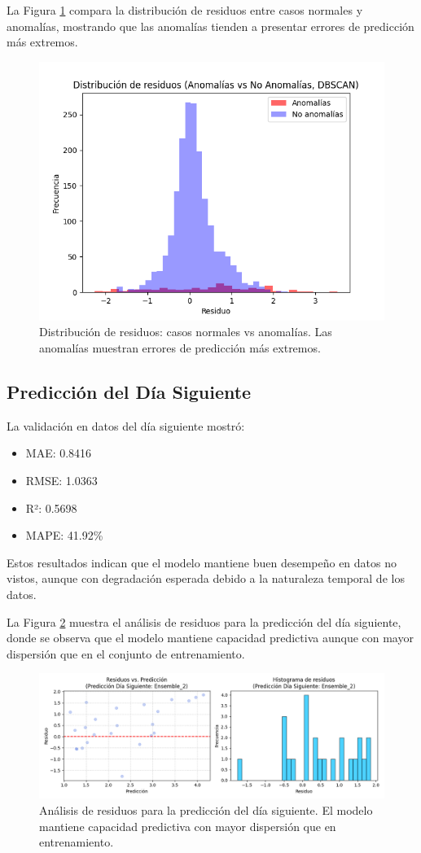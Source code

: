 \documentclass[conference]{IEEEtran}
\begin{document}
	La Figura \ref{fig:distribucion_residuos} compara la distribución de residuos entre casos normales y anomalías, mostrando que las anomalías tienden a presentar errores de predicción más extremos.
	
	\begin{figure}[htbp]
		\centering
		\includegraphics[width=0.7\linewidth]{images/Figure_5.png}
		\caption{Distribución de residuos: casos normales vs anomalías. Las anomalías muestran errores de predicción más extremos.}
		\label{fig:distribucion_residuos}
	\end{figure}
	
	\subsection{Predicción del Día Siguiente}
	La validación en datos del día siguiente mostró:
	\begin{itemize}
		\item MAE: 0.8416
		\item RMSE: 1.0363
		\item R²: 0.5698
		\item MAPE: 41.92\%
	\end{itemize}
	
	Estos resultados indican que el modelo mantiene buen desempeño en datos no vistos, aunque con degradación esperada debido a la naturaleza temporal de los datos.
	
	La Figura \ref{fig:residuos_prediccion} muestra el análisis de residuos para la predicción del día siguiente, donde se observa que el modelo mantiene capacidad predictiva aunque con mayor dispersión que en el conjunto de entrenamiento.
	
	\begin{figure}[htbp]
		\centering
		\includegraphics[width=0.9\linewidth]{images/Figure_7.png}
		\caption{Análisis de residuos para la predicción del día siguiente. El modelo mantiene capacidad predictiva con mayor dispersión que en entrenamiento.}
		\label{fig:residuos_prediccion}
	\end{figure}
	
\end{document}
